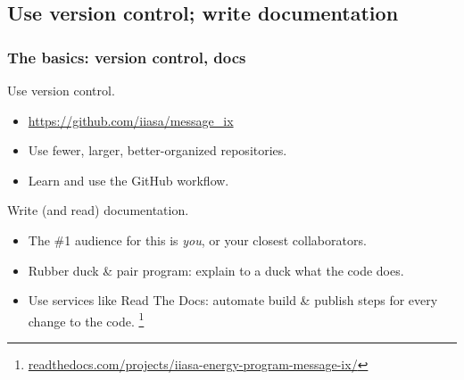 \documentclass[12pt,aspectratio=169]{beamer}
\begin{document}
\begin{frame}[plain]
\tableofcontents[currentsection]
\end{frame}

\subsection{Use version control; write documentation}
\begin{frame}
\frametitle{The basics: version control, docs}

Use version control.
\begin{itemize}
  \item \url{https://github.com/iiasa/message_ix}
  \item Use fewer, larger, better-organized repositories.
  \item Learn and use the GitHub workflow.
\end{itemize}

\bigskip
Write (and read) documentation.
\begin{itemize}
  \item The \#1 audience for this is \emph{you}, or your closest collaborators.
  \item Rubber duck \& pair program: explain to a duck what the code does.
  \item Use services like Read The Docs: automate build \& publish steps for every change to the code.%
  \footnote{\href{https://readthedocs.com/projects/iiasa-energy-program-message-ix/}{readthedocs.com/projects/iiasa-energy-program-message-ix/}}
\end{itemize}

\end{frame}
\end{document}
